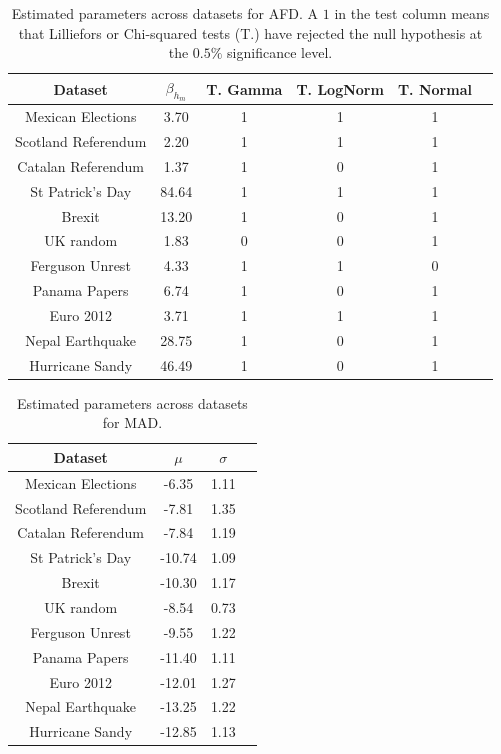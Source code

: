  \begin{table}[h] 
\caption[$\,$ AFD: Estimated parameters and tests]{Estimated parameters across datasets for AFD. A $1$ in the test column means that Lilliefors or Chi-squared tests (T.) have rejected the null hypothesis at the $0.5\%$ significance level.}
\centering 
\begin{tabular}{c c c c c c} 
\hline 
Dataset &  $\beta_{h_m}$ & T. Gamma & T. LogNorm & T. Normal \\ \hline \hline
Mexican Elections & 3.70 & 1 & 1 & 1 \\ \hline 
Scotland Referendum & 2.20 & 1 & 1 & 1 \\ \hline 
Catalan Referendum & 1.37 & 1 & 0 & 1 \\ \hline 
St Patrick's Day & 84.64 & 1 & 1 & 1 \\ \hline 
Brexit & 13.20 & 1 & 0 & 1 \\ \hline 
UK random & 1.83 & 0 & 0 & 1 \\ \hline 
Ferguson Unrest & 4.33 & 1 & 1 & 0 \\ \hline 
Panama Papers & 6.74 & 1 & 0 & 1 \\ \hline 
Euro 2012 & 3.71 & 1 & 1 & 1 \\ \hline 
Nepal Earthquake & 28.75 & 1 & 0 & 1 \\ \hline 
Hurricane Sandy & 46.49 & 1 & 0 & 1 \\ \hline 
\end{tabular} 
\end{table} 

\begin{table}[h] 
\caption[$\,$ MAD: Estimated parameters and tests]{Estimated parameters across datasets for MAD. }
\centering
\begin{tabular}{c c c c } 
\hline 
Dataset &  $\mu$ & $\sigma$  \\ \hline \hline
Mexican Elections & -6.35 & 1.11   \\ \hline 
Scotland Referendum & -7.81 & 1.35   \\ \hline 
Catalan Referendum & -7.84 & 1.19   \\ \hline 
St Patrick's Day & -10.74 & 1.09  \\ \hline 
Brexit & -10.30 & 1.17  \\ \hline 
UK random & -8.54 & 0.73  \\ \hline 
Ferguson Unrest & -9.55 & 1.22  \\ \hline 
Panama Papers & -11.40 & 1.11  \\ \hline 
Euro 2012 & -12.01 & 1.27  \\ \hline 
Nepal Earthquake & -13.25 & 1.22  \\ \hline 
Hurricane Sandy & -12.85 & 1.13  \\ \hline 
\end{tabular} \label{tab:MAD}
\end{table} 

